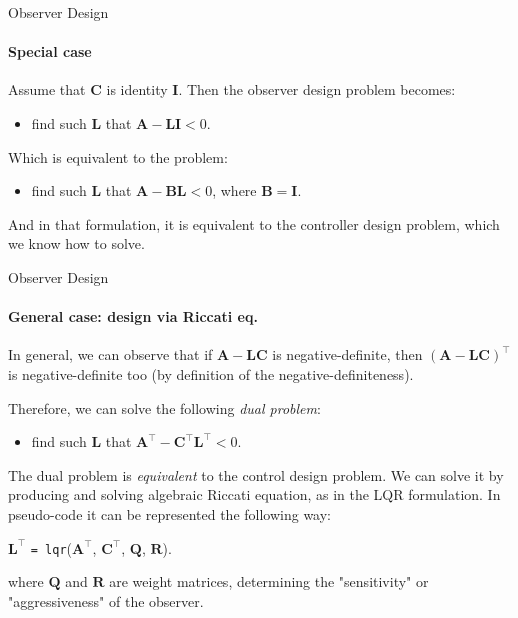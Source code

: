 \documentclass{beamer}
\begin{document}
\begin{frame}{Observer Design}
\framesubtitle{Special case}
\begin{flushleft}

Assume that $\mathbf C$ is identity $\mathbf I$. Then the observer design problem becomes: 

\begin{itemize}
    \item find such $\mathbf L$ that $\mathbf A - \mathbf L \mathbf I < 0$.
\end{itemize}

Which is equivalent to the problem: 

\begin{itemize}
    \item find such $\mathbf L$ that $\mathbf A - \mathbf B  \mathbf L < 0$, where $\mathbf B = \mathbf I$.
\end{itemize}

And in that formulation, it is equivalent to the controller design problem, which we know how to solve.

\end{flushleft}
\end{frame}


\begin{frame}{Observer Design}
\framesubtitle{General case: design via Riccati eq.}
\begin{flushleft}

In general, we can observe that if $\mathbf A - \mathbf L \mathbf C$ is negative-definite, then $(\mathbf A - 
\mathbf L \mathbf C)^{\top}$ is negative-definite too (by definition of the negative-definiteness). 

\bigskip

Therefore, we can solve the following \emph{dual problem}:

\begin{itemize}
    \item find such $\mathbf L$ that $\mathbf A^{\top} - 
\mathbf C^{\top} \mathbf L^{\top} < 0$.
\end{itemize}

\bigskip

The dual problem is \emph{equivalent} to the control design problem. We can solve it by producing and solving algebraic Riccati equation, as in the LQR formulation. In pseudo-code it can be represented the following way:

\bigskip

$\mathbf L^{\top}$ \texttt{= lqr}($\mathbf A^{\top}$, $\mathbf C^{\top}$, $\mathbf Q$, $\mathbf R$).

where $\mathbf Q$ and $\mathbf R$ are weight  matrices, determining the "sensitivity" or "aggressiveness" of the observer.


\end{flushleft}
\end{frame}
\end{document}
